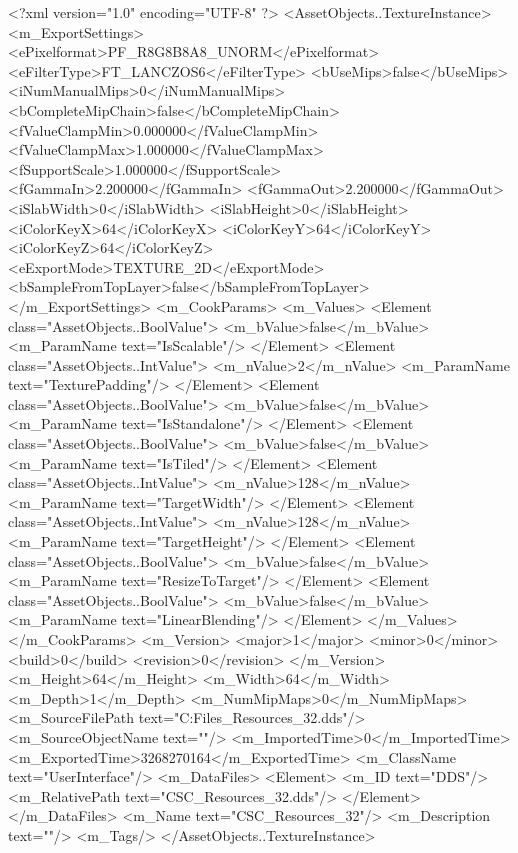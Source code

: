 <?xml version="1.0" encoding="UTF-8" ?>
<AssetObjects..TextureInstance>
	<m_ExportSettings>
		<ePixelformat>PF_R8G8B8A8_UNORM</ePixelformat>
		<eFilterType>FT_LANCZOS6</eFilterType>
		<bUseMips>false</bUseMips>
		<iNumManualMips>0</iNumManualMips>
		<bCompleteMipChain>false</bCompleteMipChain>
		<fValueClampMin>0.000000</fValueClampMin>
		<fValueClampMax>1.000000</fValueClampMax>
		<fSupportScale>1.000000</fSupportScale>
		<fGammaIn>2.200000</fGammaIn>
		<fGammaOut>2.200000</fGammaOut>
		<iSlabWidth>0</iSlabWidth>
		<iSlabHeight>0</iSlabHeight>
		<iColorKeyX>64</iColorKeyX>
		<iColorKeyY>64</iColorKeyY>
		<iColorKeyZ>64</iColorKeyZ>
		<eExportMode>TEXTURE_2D</eExportMode>
		<bSampleFromTopLayer>false</bSampleFromTopLayer>
	</m_ExportSettings>
	<m_CookParams>
		<m_Values>
			<Element class="AssetObjects..BoolValue">
				<m_bValue>false</m_bValue>
				<m_ParamName text="IsScalable"/>
			</Element>
			<Element class="AssetObjects..IntValue">
				<m_nValue>2</m_nValue>
				<m_ParamName text="TexturePadding"/>
			</Element>
			<Element class="AssetObjects..BoolValue">
				<m_bValue>false</m_bValue>
				<m_ParamName text="IsStandalone"/>
			</Element>
			<Element class="AssetObjects..BoolValue">
				<m_bValue>false</m_bValue>
				<m_ParamName text="IsTiled"/>
			</Element>
			<Element class="AssetObjects..IntValue">
				<m_nValue>128</m_nValue>
				<m_ParamName text="TargetWidth"/>
			</Element>
			<Element class="AssetObjects..IntValue">
				<m_nValue>128</m_nValue>
				<m_ParamName text="TargetHeight"/>
			</Element>
			<Element class="AssetObjects..BoolValue">
				<m_bValue>false</m_bValue>
				<m_ParamName text="ResizeToTarget"/>
			</Element>
			<Element class="AssetObjects..BoolValue">
				<m_bValue>false</m_bValue>
				<m_ParamName text="LinearBlending"/>
			</Element>
		</m_Values>
	</m_CookParams>
	<m_Version>
		<major>1</major>
		<minor>0</minor>
		<build>0</build>
		<revision>0</revision>
	</m_Version>
	<m_Height>64</m_Height>
	<m_Width>64</m_Width>
	<m_Depth>1</m_Depth>
	<m_NumMipMaps>0</m_NumMipMaps>
	<m_SourceFilePath text="C:\Users\Shadow\Desktop\Working Files\Icons\Resources\CSC_Resources_32.dds"/>
	<m_SourceObjectName text=""/>
	<m_ImportedTime>0</m_ImportedTime>
	<m_ExportedTime>3268270164</m_ExportedTime>
	<m_ClassName text="UserInterface"/>
	<m_DataFiles>
		<Element>
			<m_ID text="DDS"/>
			<m_RelativePath text="CSC_Resources_32.dds"/>
		</Element>
	</m_DataFiles>
	<m_Name text="CSC_Resources_32"/>
	<m_Description text=""/>
	<m_Tags/>
</AssetObjects..TextureInstance>

